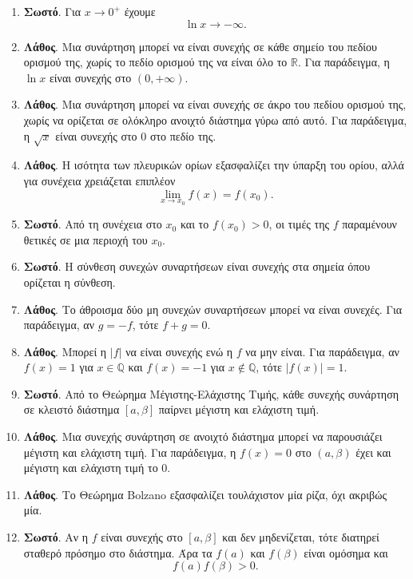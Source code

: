 \begin{enumerate}[label=\textbf{1.\arabic*.}]
\item \textbf{Σωστό}. Για $x\to0^+$ έχουμε
\[
\ln x\to-\infty.
\]

\item \textbf{Λάθος}. Μια συνάρτηση μπορεί να είναι συνεχής σε κάθε σημείο του πεδίου ορισμού της, χωρίς το πεδίο ορισμού της να είναι όλο το $\mathbb{R}$. Για παράδειγμα, η $\ln x$ είναι συνεχής στο $(0,+\infty)$.

\item \textbf{Λάθος}. Μια συνάρτηση μπορεί να είναι συνεχής σε άκρο του πεδίου ορισμού της, χωρίς να ορίζεται σε ολόκληρο ανοιχτό διάστημα γύρω από αυτό. Για παράδειγμα, η $\sqrt{x}$ είναι συνεχής στο $0$ στο πεδίο της.

\item \textbf{Λάθος}. Η ισότητα των πλευρικών ορίων εξασφαλίζει την ύπαρξη του ορίου, αλλά για συνέχεια χρειάζεται επιπλέον
\[
\lim_{x\to x_0}f(x)=f(x_0).
\]

\item \textbf{Σωστό}. Από τη συνέχεια στο $x_0$ και το $f(x_0)>0$, οι τιμές της $f$ παραμένουν θετικές σε μια περιοχή του $x_0$.

\item \textbf{Σωστό}. Η σύνθεση συνεχών συναρτήσεων είναι συνεχής στα σημεία όπου ορίζεται η σύνθεση.

\item \textbf{Λάθος}. Το άθροισμα δύο μη συνεχών συναρτήσεων μπορεί να είναι συνεχές. Για παράδειγμα, αν $g=-f$, τότε $f+g=0$.

\item \textbf{Λάθος}. Μπορεί η $|f|$ να είναι συνεχής ενώ η $f$ να μην είναι. Για παράδειγμα, αν $f(x)=1$ για $x\in\mathbb{Q}$ και $f(x)=-1$ για $x\notin\mathbb{Q}$, τότε $|f(x)|=1$.

\item \textbf{Σωστό}. Από το Θεώρημα Μέγιστης-Ελάχιστης Τιμής, κάθε συνεχής συνάρτηση σε κλειστό διάστημα $[a,\beta]$ παίρνει μέγιστη και ελάχιστη τιμή.

\item \textbf{Λάθος}. Μια συνεχής συνάρτηση σε ανοιχτό διάστημα μπορεί να παρουσιάζει μέγιστη και ελάχιστη τιμή. Για παράδειγμα, η $f(x)=0$ στο $(a,\beta)$ έχει και μέγιστη και ελάχιστη τιμή το $0$.

\item \textbf{Λάθος}. Το Θεώρημα Bolzano εξασφαλίζει τουλάχιστον μία ρίζα, όχι ακριβώς μία.

\item \textbf{Σωστό}. Αν η $f$ είναι συνεχής στο $[a,\beta]$ και δεν μηδενίζεται, τότε διατηρεί σταθερό πρόσημο στο διάστημα. Άρα τα $f(a)$ και $f(\beta)$ είναι ομόσημα και
\[
f(a)f(\beta)>0.
\]


\end{enumerate}
